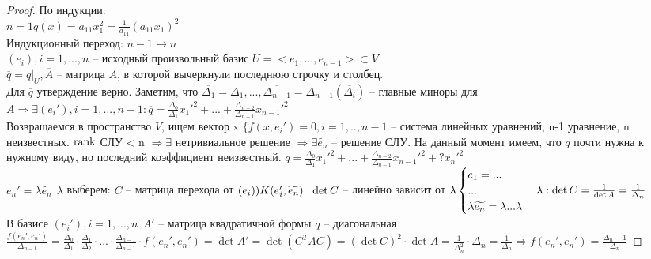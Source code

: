 \begin{proof}
	По индукции.\\
	$n=1 q(x) = a_{11} x^2_1 = \frac{1}{a_{11}} (a_{11}x_1)^2$\\
	Индукционный переход: $n-1 \to n$\\
	$(e_i), i = 1, ..., n$ -- исходный произвольный базис $U = <e_1, ..., e_{n-1}> \subset V$\\
	$\overline{q} = q \big|_U, \overline{A}$ -- матрица $A$, в которой вычеркнули последнюю строчку и столбец.\\
	Для $\overline{q}$ утверждение верно. 
	Заметим, что $\overline{\Delta_1} = \Delta_1, ..., \overline{\Delta_{n-1}} = \Delta_{n-1} (\overline{\Delta_i})$ -- главные миноры для $\overline{A} \Rightarrow
	\exists (e_i'), i = 1, ..., n-1: \overline{q} = \frac{\Delta_0}{\Delta_1} x_1'^2 + ... + \frac{\Delta_{n-2}}{\Delta_{n-1}} x_{n-1}'^2$\\
	Возвращаемся в пространство $V$, ищем вектор x $\{ f(x, e_i') = 0, i = 1,..,n-1$ -- система линейных уравнений, n-1 уравнение, n неизвестных.
	$\operatorname{rank}$ СЛУ < n $\Rightarrow \exists$ нетривиальное решение $\Rightarrow \exists \widetilde{e_n}$ -- решение СЛУ. 
	На данный момент имеем, что $q$ почти нужна к нужному виду, но последний коэффициент неизвестный. 
	$q = \frac{\Delta_0}{\Delta_1} x_1'^2 + ... + \frac{\Delta_{n-2}}{\Delta_{n-1}} x_{n-1}'^2 + ? x_n'^2$\\
	$e_n' = \lambda \widetilde{e_n} \ \ \lambda$ выберем: $C$ -- матрица перехода от $(e_i))\\
	K(e_i', \widetilde{e_n}) \ \ \det C$ -- линейно зависит от $\lambda\\ 
	\begin{cases}
		e_1 = ...\\
		...\\
		\lambda \widetilde{e_n} = \lambda ... \lambda	
	\end{cases}\\
	\lambda: \det C = \frac{1}{\det A} = \frac{1}{\Delta_n}$\\
	В базисе $(e_i'), i = 1, ..., n \ \ A'$ -- матрица квадратичной формы $q$ -- диагональная\\
	$\frac{f(e_n', e_n')}{\Delta_{n-1}} = \frac{\Delta_0}{\Delta_1} \cdot \frac{\Delta_1}{\Delta_2} \cdot ... \cdot \frac{\Delta_{n-1}}{\Delta_{n-1}} \cdot f(e_n', e_n') = 
	\det A' = \det (C^TAC) = (\det C)^2 \cdot \det A = \frac{1}{\Delta^2_n} \cdot \Delta_n = \frac{1}{\Delta_n} \Rightarrow f(e_n', e_n') = \frac{\Delta_n-1}{\Delta_n} $
\end{proof}

